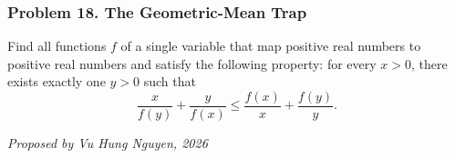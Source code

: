 \subsubsection*{Problem 18. The Geometric-Mean Trap}

\begin{exercisebox}[hard]

Find all functions $f$ of a single variable that map positive real
numbers to positive real numbers and satisfy the following property:
for every $x>0$, there exists exactly one $y>0$ such that
\[
\frac{x}{f(y)}+\frac{y}{f(x)}
\leq\frac{f(x)}x+\frac{f(y)}y.
\]

\begin{flushright}
\textit{Proposed by Vu Hung Nguyen, 2026}
\end{flushright}


\end{exercisebox}